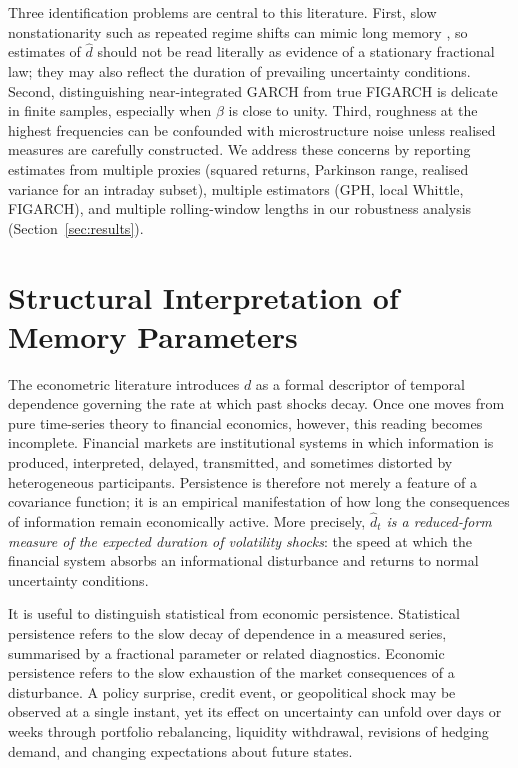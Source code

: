 \documentclass[11pt,a4paper]{article}
\newcommand{\dhat}{\hat d}
\begin{document}
Three identification problems are central to this literature. First, slow
nonstationarity such as repeated regime shifts can mimic long memory
\citep{mikosch2004nonstationarities}, so estimates of $\dhat$ should not
be read literally as evidence of a stationary fractional law; they may
also reflect the duration of prevailing uncertainty conditions. Second,
distinguishing near-integrated GARCH from true FIGARCH is delicate in
finite samples, especially when $\beta$ is close to unity. Third,
roughness at the highest frequencies can be confounded with microstructure
noise unless realised measures are carefully constructed. We address these
concerns by reporting estimates from multiple proxies (squared returns,
Parkinson range, realised variance for an intraday subset), multiple
estimators (GPH, local Whittle, FIGARCH), and multiple rolling-window
lengths in our robustness analysis (Section~\ref{sec:results}).

\section{Structural Interpretation of Memory Parameters}
\label{sec:structural}

The econometric literature introduces $d$ as a formal descriptor of
temporal dependence governing the rate at which past shocks decay. Once
one moves from pure time-series theory to financial economics, however,
this reading becomes incomplete. Financial markets are institutional
systems in which information is produced, interpreted, delayed,
transmitted, and sometimes distorted by heterogeneous participants.
Persistence is therefore not merely a feature of a covariance function;
it is an empirical manifestation of how long the consequences of
information remain economically active. More precisely, \emph{$\hat d_t$
is a reduced-form measure of the expected duration of volatility shocks}:
the speed at which the financial system absorbs an informational
disturbance and returns to normal uncertainty conditions.

It is useful to distinguish statistical from economic persistence.
Statistical persistence refers to the slow decay of dependence in a
measured series, summarised by a fractional parameter or related
diagnostics. Economic persistence refers to the slow exhaustion of the
market consequences of a disturbance. A policy surprise, credit event,
or geopolitical shock may be observed at a single instant, yet its
effect on uncertainty can unfold over days or weeks through portfolio
rebalancing, liquidity withdrawal, revisions of hedging demand, and
changing expectations about future states.
\end{document}
